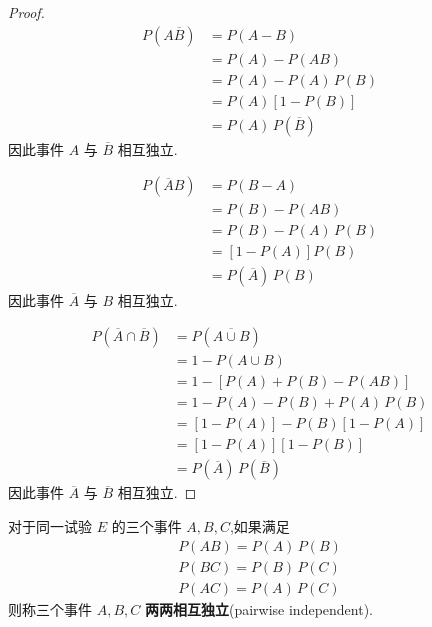 \begin{proof}
    \vspace{-1em}
    {\linespread{1.18}\selectfont
    $$
    \begin{aligned}
        P(A \overline{B}) &= P(A-B) \\
        &= P(A) - P(AB) \\
        &= P(A) - P(A) \, P(B)\\
        &= P(A)[1-P(B)]\\
        &= P(A) \, P(\overline{B})
    \end{aligned}
    $$
    因此事件 $A$ 与 $\overline{B}$ 相互独立.
    }

    $$
    \begin{aligned}
        P(\overline{A} B) &= P(B-A) \\
        &= P(B) - P(AB) \\
        &= P(B) - P(A) \, P(B) \\
        &= [1-P(A)] P(B) \\
        &= P(\overline{A}) \, P(B)
    \end{aligned}
    $$
    因此事件 $\overline{A}$ 与 $B$ 相互独立.

    $$
    \begin{aligned}
        P(\overline{A} \cap \overline{B}) &= P(\overline{A \cup B}) \\
        &= 1 - P(A \cup B) \\
        &= 1 - [P(A) + P(B) - P(AB)] \\
        &= 1 - P(A) - P(B) + P(A) \, P(B) \\
        &= [1-P(A)] - P(B) [1-P(A)] \\
        &= [1-P(A)][1-P(B)] \\
        &= P(\overline{A}) \, P(\overline{B})
    \end{aligned}
    $$
    因此事件 $\overline{A}$ 与 $\overline{B}$ 相互独立.
\end{proof}

\begin{definition}
    \indent 对于同一试验 $E$ 的三个事件 $A,B,C$,如果满足
    \begin{gather*}
        P(AB) = P(A) \, P(B) \\
        P(BC) = P(B) \, P(C) \\
        P(AC) = P(A) \, P(C)
    \end{gather*}
    则称三个事件 $A,B,C$ \textbf{两两相互独立}(pairwise independent).
\end{definition}

